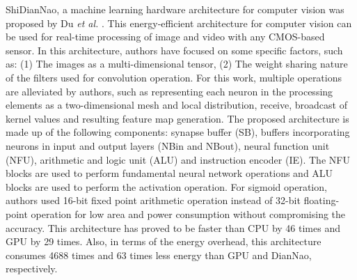\documentclass[journal]{IEEEtran}
\begin{document}
\par ShiDianNao, a machine learning hardware architecture for computer vision was proposed by Du \textit{et al.} \cite{paper23}. This energy-efficient architecture for computer vision can be used for real-time processing of image and video with any CMOS-based sensor. In this architecture, authors have focused on some specific factors, such as: (1) The images as a multi-dimensional tensor, (2) The weight sharing nature of the filters used for convolution operation. For this work, multiple operations are alleviated by authors, such as representing each neuron in the processing elements as a two-dimensional mesh and local distribution, receive, broadcast of kernel values and resulting feature map generation. The proposed architecture is made up of the following components: synapse buffer (SB), buffers incorporating neurons in input and output layers (NBin and NBout), neural function unit (NFU), arithmetic and logic unit (ALU) and instruction encoder (IE). The NFU blocks are used to perform fundamental neural network operations and ALU blocks are used to perform the activation operation. For sigmoid operation, authors used 16-bit fixed point arithmetic operation instead of 32-bit floating-point operation for low area and power consumption without compromising the accuracy. This architecture has proved to be faster than CPU by 46 times and GPU by 29 times. Also, in terms of the energy overhead, this architecture consumes 4688 times and 63 times less energy than GPU and DianNao, respectively. 
\end{document}
